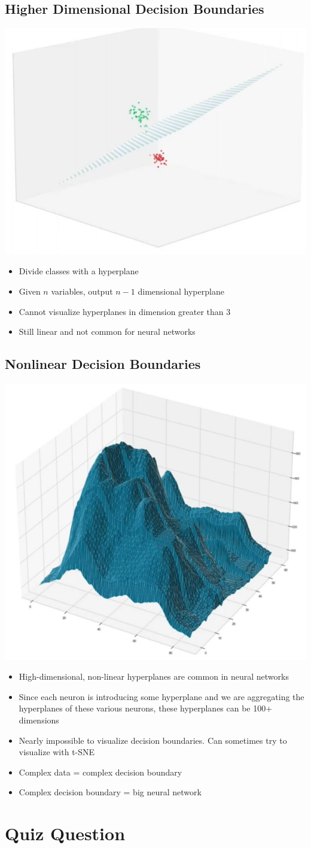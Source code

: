 \subsection{Higher Dimensional Decision Boundaries}
\includegraphics[width=0.25\linewidth]{img//intro//introNN/image5.png}
\begin{itemize}
    \item Divide classes with a hyperplane
    \item Given \(n\) variables, output \(n - 1\) dimensional hyperplane
    \item Cannot visualize hyperplanes in dimension greater than 3
    \item Still linear and not common for neural networks
\end{itemize}

\subsection{Nonlinear Decision Boundaries}
\includegraphics[width=0.25\linewidth]{img//intro//introNN/image6.png}
\begin{itemize}
    \item High-dimensional, non-linear hyperplanes are common in neural networks
    \item Since each neuron is introducing some hyperplane and we are aggregating the hyperplanes of these various neurons, these hyperplanes can be 100+ dimensions
    \item Nearly impossible to visualize decision boundaries. Can sometimes try to visualize with t-SNE
    \item Complex data = complex decision boundary
    \item Complex decision boundary = big neural network
\end{itemize}


\section{Quiz Question}

